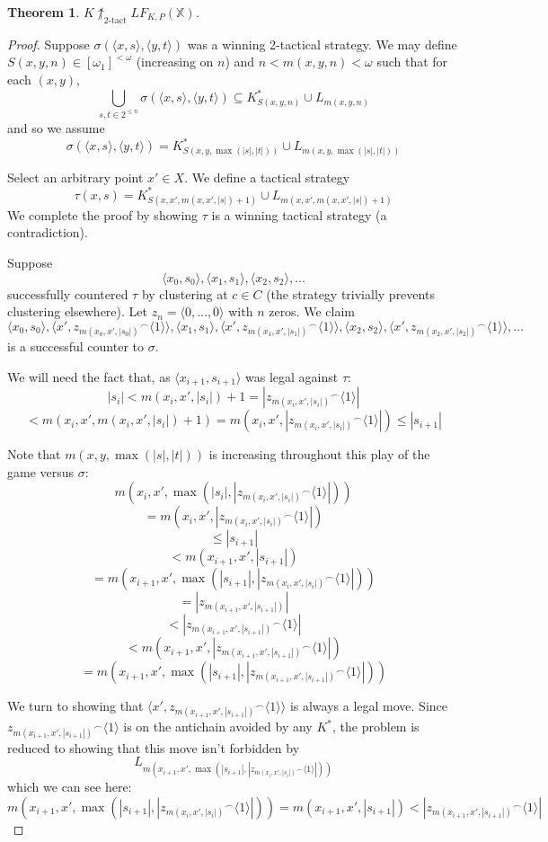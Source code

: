 \documentclass[11pt]{article}
\theoremstyle{plain}
\newtheorem{theorem}{Theorem}
\theoremstyle{definition}
\theoremstyle{remark}
\newcommand{\ktactwin}[1]{\uparrow_{#1\text{-tact}}}
\newcommand{\lfkpgame}[1]{LF_{K,P}(#1)}
\newcommand{\<}{\langle}
\renewcommand{\>}{\rangle}
\begin{document}
\begin{theorem}
$K\not\ktactwin{2}\lfkpgame{\mathbb{X}}$.
\end{theorem}

\begin{proof}
Suppose $\sigma(\<x,s\>,\<y,t\>)$ was a winning 2-tactical strategy. We may define $S(x,y,n)\in [\omega_1]^{<\omega}$ (increasing on $n$) and $n<m(x,y,n)<\omega$ such that for each $(x,y)$,
  \[
    \bigcup_{s,t \in 2^{\leq n}} \sigma(\<x,s\>,\<y,t\>) \subseteq 
    K^*_{S(x,y,n)} \cup L_{m(x,y,n)}
  \]
and so we assume
  \[
    \sigma(\<x,s\>,\<y,t\>) =
    K^*_{S(x,y,\max(|s|,|t|))} \cup L_{m(x,y,\max(|s|,|t|))}
  \]

Select an arbitrary point $x' \in X$. We define a tactical strategy 
  \[
  \tau(x,s) = 
  K^*_{S(x,x',m(x,x',|s|)+1)} \cup L_{m(x,x',m(x,x',|s|)+1)}
  \]
We complete the proof by showing $\tau$ is a winning tactical strategy (a contradiction).

Suppose
\[
\<x_0, s_0\>, \<x_1, s_1\>, \<x_2, s_2\>, \dots
\]
successfully countered $\tau$ by clustering at $c\in C$ (the strategy trivially prevents clustering elsewhere). Let $z_n = \<0,\dots,0\>$ with $n$ zeros. We claim
\[
\<x_0, s_0\>, \<x', {z_{m(x_0,x',|s_0|)}}^\frown\<1\>\>, \<x_1, s_1\>, \<x', {z_{m(x_1,x',|s_1|)}}^\frown\<1\>\>,  \<x_2, s_2\>, \<x', {z_{m(x_2,x',|s_2|)}}^\frown\<1\>\>, \dots
\]
is a successful counter to $\sigma$.

We will need the fact that, as $\<x_{i+1},s_{i+1}\>$ was legal against $\tau$:
  \[
    |s_i| <
    m(x_i,x',|s_i|)+1 =
    |{z_{m(x_i,x',|s_i|)}}^\frown\<1\>| 
  \]
  \[
    <
    m(x_i,x',m(x_i,x',|s_i|)+1) =
    m(x_i,x',|{z_{m(x_i,x',|s_i|)}}^\frown\<1\>|) \leq
    |s_{i+1}|
  \]

Note that $m(x,y,\max(|s|,|t|))$ is increasing throughout this play of the game versus $\sigma$:
  \[
    m(x_i,x',\max(|s_i|,|{z_{m(x_i,x',|s_i|)}}^\frown\<1\>|))
  \]
  \[
    =
    m(x_i,x',|{z_{m(x_i,x',|s_i|)}}^\frown\<1\>|)
  \]
  \[
    \leq
    |s_{i+1}| 
  \]
  \[
    <
    m(x_{i+1},x',|s_{i+1}|)
  \]
  \[
    =
    m(x_{i+1},x',\max(|s_{i+1}|,|{z_{m(x_i,x',|s_i|)}}^\frown\<1\>|))
  \]
  \[
    =
    |{z_{m(x_{i+1},x',|s_{i+1}|)}}|
  \]
  \[
    <
    |{z_{m(x_{i+1},x',|s_{i+1}|)}}^\frown\<1\>|
  \]
  \[
    <
    m(x_{i+1},x',|{z_{m(x_{i+1},x',|s_{i+1}|)}}^\frown\<1\>|)
  \]
  \[
    =
    m(x_{i+1},x',\max(|s_{i+1}|,|{z_{m(x_{i+1},x',|s_{i+1}|)}}^\frown\<1\>|))
  \]

We turn to showing that $\<x', {z_{m(x_{i+1},x',|s_{i+1}|)}}^\frown\<1\>\>$ is always a legal move. Since ${z_{m(x_{i+1},x',|s_{i+1}|)}}^\frown\<1\>$ is on the antichain avoided by any $K^*$, the problem is reduced to showing that this move isn't forbidden by
  \[
  L_{m(x_{i+1},x',\max(|s_{i+1}|,|{z_{m(x_i,x',|s_i|)}}^\frown\<1\>|))}
  \]
which we can see here:
  \[
    m(x_{i+1},x',\max(|s_{i+1}|,|{z_{m(x_i,x',|s_i|)}}^\frown\<1\>|)) =
    m(x_{i+1},x',|s_{i+1}|) <
    |{z_{m(x_{i+1},x',|s_{i+1}|)}}^\frown\<1\>|
  \]


\end{proof}
\end{document}
